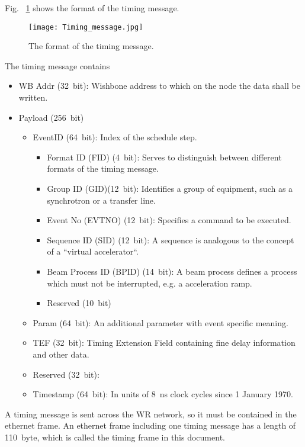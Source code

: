 Fig. ~\ref{Timing_message} shows the format of the timing message. 
\begin{figure}[H]
   \centering   
   \texttt{[image: Timing\_message.jpg]}
   \caption{The format of the timing message.}
   \label{Timing_message}
\end{figure}
The timing message contains 
\begin{itemize}
	\item WB Addr (\SI{32}{bit}): Wishbone address to which on the node the data shall be written.
	\item Payload (\SI{256}{bit})
		\begin{itemize}
			\item EventID (\SI{64}{bit}): Index of the schedule step.
		\begin{itemize}
			\item Format ID (FID) (\SI{4}{bit}): Serves to distinguish between different formats of the timing message.
			\item Group ID (GID)(\SI{12}{bit}): Identifies a group of equipment, such as a synchrotron or a transfer line.
			\item Event No (EVTNO) (\SI{12}{bit}): Specifies a command to be executed.
			\item Sequence ID (SID) (\SI{12}{bit}): A sequence is analogous to the concept of a ``virtual accelerator``. 
			\item Beam Process ID (BPID) (\SI{14}{bit}): A beam process defines a process which must not be interrupted, e.g. a acceleration ramp. 
			\item Reserved (\SI{10}{bit})
		\end{itemize}
			\item Param (\SI{64}{bit}): An additional parameter with event specific meaning.
			\item TEF (\SI{32}{bit}): Timing Extension Field containing fine delay information and other data.
			\item Reserved (\SI{32}{bit}): 
			\item Timestamp (\SI{64}{bit}): In units of \SI{8}{\ns} clock cycles since 1 January 1970.
		\end{itemize}
\end{itemize}
A timing message is sent across the WR network, so it must be contained in the ethernet frame. An ethernet frame including one timing message has a length of \SI{110}{byte}, which is called the timing frame in this document.

